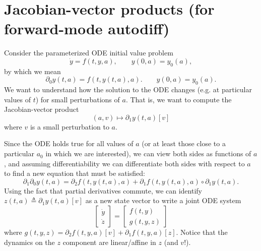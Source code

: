 \documentclass{article}
\begin{document}
\section{Jacobian-vector products (for forward-mode autodiff)}
Consider the parameterized ODE initial value problem
\begin{equation}
    \dot y = f(t, y, a), \qquad y(0, a) = y_0(a),
\end{equation}
by which we mean
\begin{equation}
    \partial_0 y(t, a) = f(t, y(t, a), a). \qquad y(0, a) = y_0(a).
\end{equation}
We want to understand how the solution to the ODE changes (e.g. at particular
values of $t$) for small perturbations of $a$. That is, we want to compute the
Jacobian-vector product
\begin{equation}
    (a, v) \mapsto \partial_1 y(t, a)[v]
\end{equation}
where $v$ is a small perturbation to $a$.

Since the ODE holds true for all values of $a$ (or at least those close to a
particular $a_0$ in which we are interested), we can view both sides as
functions of $a$, and assuming differentiability we can differentiate both
sides with respect to $a$ to find a new equation that must be satisfied:
\begin{equation}
    \partial_1 \partial_0 y(t, a) = \partial_2 f(t, y(t, a), a) + \partial_1 f(t, y(t, a), a) \circ \partial_1 y(t, a).
\end{equation}
Using the fact that partial derivatives commute, we can identify $z(t, a)
\triangleq \partial_1 y(t, a)[v]$ as a new state vector to write a joint ODE system
\begin{equation}
    \begin{bmatrix}
        \dot y \\
        \dot z
    \end{bmatrix}
    =
    \begin{bmatrix}
        f(t, y) \\
        g(t, y, z)
    \end{bmatrix}
\end{equation}
where $g(t, y, z) = \partial_2 f(t, y, a)[v] + \partial_1 f(t, y, a)[z]$. Notice
that the dynamics on the $z$ component are linear/affine in $z$ (and $v$!).

\end{document}
